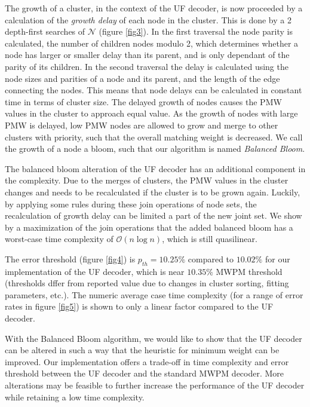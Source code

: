 \documentclass[11pt, a4paper, twoside, titlepage, usenames,dvipsnames]{report}
\begin{document}
The growth of a cluster, in the context of the UF decoder, is now proceeded by a calculation of the \emph{growth delay} of each node in the cluster. This is done by a 2 depth-first searches of $\mathcal{N}$ (figure \ref{fig3}). In the first traversal the node parity is calculated, the number of children nodes modulo 2, which determines whether a node has larger or smaller delay than its parent, and is only dependant of the parity of its children. In the second traversal the delay is calculated using the node sizes and parities of a node and its parent, and the length of the edge connecting the nodes. This means that node delays can be calculated in constant time in terms of cluster size. The delayed growth of nodes causes the PMW values in the cluster to approach equal value. As the growth of nodes with large PMW is delayed, low PMW nodes are allowed to grow and merge to other clusters with priority, such that the overall matching weight is decreased. We call the growth of a node a bloom, such that our algorithm is named \emph{Balanced Bloom}.

The balanced bloom alteration of the UF decoder has an additional component in the complexity. Due to the merges of clusters, the PMW values in the cluster changes and needs to be recalculated if the cluster is to be grown again. Luckily, by applying some rules during these join operations of node sets, the recalculation of growth delay can be limited a part of the new joint set. We show by a maximization of the join operations that the added balanced bloom has a worst-case time complexity of $\mathcal{O}(n \log n)$, which is still quasilinear.

The error threshold (figure \ref{fig4}) is $p_{th} = 10.25\%$ compared to $10.02\%$ for our implementation of the UF decoder, which is near $10.35\%$ MWPM threshold (thresholds dffer from reported value due to changes in cluster sorting, fitting parameters, etc.). The numeric average case time complexity (for a range of error rates in figure \ref{fig5}) is shown to only a linear factor compared to the UF decoder.

With the Balanced Bloom algorithm, we would like to show that the UF decoder can be altered in such a way that the heuristic for minimum weight can be improved. Our implementation offers a trade-off in time complexity and error threshold between the UF decoder and the standard MWPM decoder. More alterations may be feasible to further increase the performance of the UF decoder while retaining a low time complexity.
\end{document}
